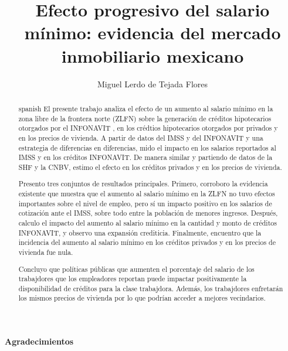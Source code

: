 \documentclass{tesisITAM}
\title{Efecto progresivo del salario mínimo: evidencia del mercado inmobiliario mexicano}
\author{Miguel Lerdo de Tejada Flores}
\begin{document}
	
	\maketitle
	\publicationrights
	
	\begin{center}
	\textbf{Agradecimientos}
	\end{center}
	
	
	\clearpage
	



	\begin{abstract}{spanish}
		El presente trabajo analiza el efecto de un aumento al salario mínimo en la zona libre de la frontera norte (ZLFN) sobre la generación de créditos hipotecarios otorgados por el INFONAVIT , en los crédtios hipotecarios otorgados por privados y en los precios de vivienda. A partir de datos del IMSS y del INFONAVIT y una estrategia de diferencias en diferencias, mido el impacto en los salarios reportados al IMSS y en los créditos INFONAVIT. De manera similar y partiendo de datos de la SHF y la CNBV, estimo el efecto en los créditos privados y en los precios de vivienda. 
		
Presento tres conjuntos de resultados principales. Primero, corroboro la evidencia existente que muestra que el aumento al salario mínimo en la ZLFN no tuvo efectos importantes sobre el nivel de empleo, pero sí un impacto positivo en los salarios de cotización ante el IMSS, sobre todo entre la población de menores ingresos. Después, calculo el impacto del aumento al salario mínimo en la cantidad y monto de créditos INFONAVIT, y observo una expansión crediticia. Finalmente, encuentro que la incidencia del aumento al salario mínimo en los créditos privados y en los precios de vivienda fue nula. 

Concluyo que políticas públicas que aumenten el porcentaje del salario de los trabajdores que los empleadores reportan  puede impactar positivamente la disponibilidad de créditos para la clase trabajdora. Además, los trabajdores enfretarán los mismos precios de vivienda por lo que podrían acceder a mejores vecindarios.


	\end{abstract}
\end{document}
